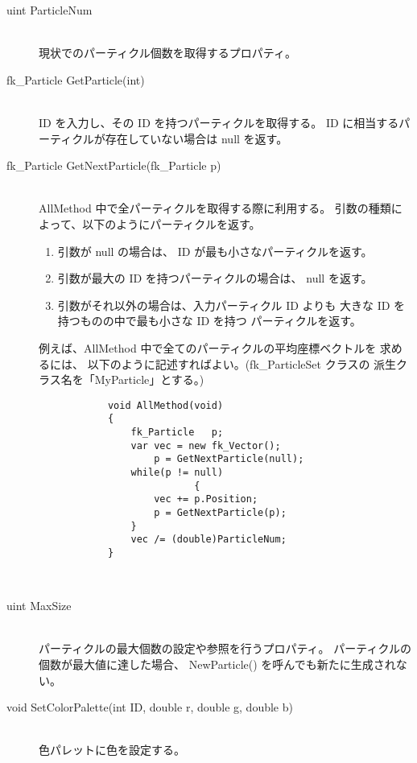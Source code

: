 \begin{description}
\item[uint ParticleNum] ~ \\
	現状でのパーティクル個数を取得するプロパティ。\\

\item[fk\_Particle GetParticle(int)] ~ \\
	ID を入力し、その ID を持つパーティクルを取得する。
	ID に相当するパーティクルが存在していない場合は null を返す。\\

\item[fk\_Particle GetNextParticle(fk\_Particle p)] ~ \\
	AllMethod 中で全パーティクルを取得する際に利用する。
	引数の種類によって、以下のようにパーティクルを返す。
	\begin{enumerate}
	 \item 引数が null の場合は、
		ID が最も小さなパーティクルを返す。
	 \item 引数が最大の ID を持つパーティクルの場合は、
		null を返す。
	 \item 引数がそれ以外の場合は、入力パーティクル ID よりも
		大きな ID を持つものの中で最も小さな ID を持つ
		パーティクルを返す。
	\end{enumerate}
	例えば、AllMethod 中で全てのパーティクルの平均座標ベクトルを
	求めるには、
	以下のように記述すればよい。(fk\_ParticleSet クラスの
	派生クラス名を「MyParticle」とする。)
	\begin{screen}
	\begin{verbatim}
	        void AllMethod(void)
	        {
	            fk_Particle   p;
	            var vec = new fk_Vector();
		            p = GetNextParticle(null);
	            while(p != null)
                           {
	                vec += p.Position;
	                p = GetNextParticle(p);
	            }
	            vec /= (double)ParticleNum;
	        }
	\end{verbatim}
	\end{screen} \\

\item[uint MaxSize] ~ \\
	パーティクルの最大個数の設定や参照を行うプロパティ。
	パーティクルの個数が最大値に達した場合、
	NewParticle() を呼んでも新たに生成されない。\\

\item[void SetColorPalette(int ID, double r, double g, double b)] ~ \\
	色パレットに色を設定する。
\end{description}

